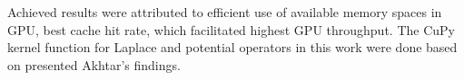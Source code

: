\vspace{0.2cm}


Achieved results were attributed to efficient use of available memory spaces in GPU, best cache hit rate, which facilitated highest GPU throughput. The CuPy kernel function for Laplace and potential operators in this work were done based on presented Akhtar's findings.